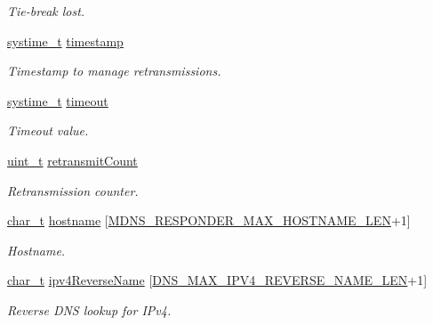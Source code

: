 \begin{DoxyCompactItemize}
\begin{DoxyCompactList}\small\item\em Tie-\/break lost. \end{DoxyCompactList}\item 
\hyperlink{compiler__port_8h_ae3e32a98d431a02106616da3071832dd}{systime\+\_\+t} \hyperlink{struct__MdnsResponderContext_a15e1a1f5a529577dc13df6b52cceb374}{timestamp}
\begin{DoxyCompactList}\small\item\em Timestamp to manage retransmissions. \end{DoxyCompactList}\item 
\hyperlink{compiler__port_8h_ae3e32a98d431a02106616da3071832dd}{systime\+\_\+t} \hyperlink{struct__MdnsResponderContext_a7978f47575bd7db7c981429b000a3173}{timeout}
\begin{DoxyCompactList}\small\item\em Timeout value. \end{DoxyCompactList}\item 
\hyperlink{compiler__port_8h_a12a1e9b3ce141648783a82445d02b58d}{uint\+\_\+t} \hyperlink{struct__MdnsResponderContext_aad97595170da7fa03556f920e34bd2a8}{retransmit\+Count}
\begin{DoxyCompactList}\small\item\em Retransmission counter. \end{DoxyCompactList}\item 
\hyperlink{compiler__port_8h_a40bb5262bf908c328fbcfbe5d29d0201}{char\+\_\+t} \hyperlink{struct__MdnsResponderContext_a7b7b8d5e70c7b780f57644e943f4ef94}{hostname} \mbox{[}\hyperlink{mdns__responder_8h_a64d75efcec0851c52a5e19d8ef2b1e1d}{M\+D\+N\+S\+\_\+\+R\+E\+S\+P\+O\+N\+D\+E\+R\+\_\+\+M\+A\+X\+\_\+\+H\+O\+S\+T\+N\+A\+M\+E\+\_\+\+L\+EN}+1\mbox{]}
\begin{DoxyCompactList}\small\item\em Hostname. \end{DoxyCompactList}\item 
\hyperlink{compiler__port_8h_a40bb5262bf908c328fbcfbe5d29d0201}{char\+\_\+t} \hyperlink{struct__MdnsResponderContext_a5fbd5de5195e260af11d040548fd592f}{ipv4\+Reverse\+Name} \mbox{[}\hyperlink{dns__common_8h_a0cc1e67080053e976ed70dc495a12ef6}{D\+N\+S\+\_\+\+M\+A\+X\+\_\+\+I\+P\+V4\+\_\+\+R\+E\+V\+E\+R\+S\+E\+\_\+\+N\+A\+M\+E\+\_\+\+L\+EN}+1\mbox{]}
\begin{DoxyCompactList}\small\item\em Reverse D\+NS lookup for I\+Pv4. \end{DoxyCompactList}\item 

\end{DoxyCompactItemize}

